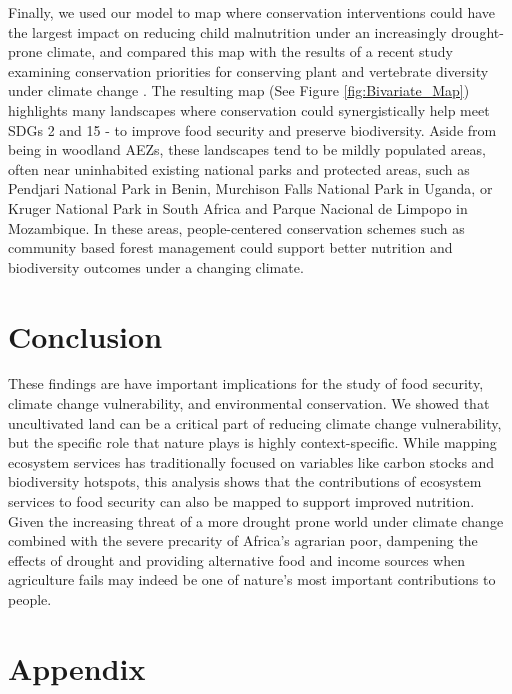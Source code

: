\documentclass[titlepage]{article}
\begin{document}
Finally, we used our model to map where conservation interventions could have the largest impact on reducing child malnutrition under an increasingly drought-prone climate, and compared this map with the results of a recent study examining conservation priorities for conserving plant and vertebrate diversity under climate change \citep{hannah2020}.  The resulting map (See Figure \ref{fig:Bivariate_Map}) highlights many landscapes where conservation could synergistically help meet SDGs 2 and 15 - to improve food security and preserve biodiversity.  Aside from being in woodland AEZs, these landscapes tend to be mildly populated areas, often near uninhabited existing national parks and protected areas, such as Pendjari National Park in Benin, Murchison Falls National Park in Uganda, or Kruger National Park in South Africa and Parque Nacional de Limpopo in Mozambique.  In these areas, people-centered conservation schemes such as community based forest management could support better nutrition and biodiversity outcomes under a changing climate.

\section{Conclusion}
These findings are have important implications for the study of food security, climate change vulnerability, and environmental conservation.  We showed that uncultivated land can be a critical part of reducing climate change vulnerability, but the specific role that nature plays is highly context-specific.  While mapping ecosystem services has traditionally focused on variables like carbon stocks and biodiversity hotspots, this analysis shows that the contributions of ecosystem services to food security can also be mapped to support improved nutrition.  Given the increasing threat of a more drought prone world under climate change \citep{Dai2013} combined with the severe precarity of Africa's agrarian poor, dampening the effects of drought and providing alternative food and income sources when agriculture fails may indeed be one of nature's most important contributions to people.

\printbibliography

\setcounter{section}{0}
\renewcommand{\thetable}{A\arabic{section}}
\section*{Appendix} \label{AppendixA}
\setcounter{table}{0}
\setcounter{figure}{0}
\renewcommand{\thetable}{A\arabic{table}}
\renewcommand{\thefigure}{A\arabic{figure}}
\end{document}
